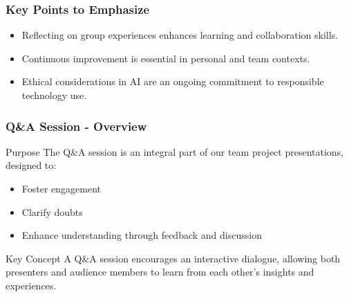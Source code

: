 \documentclass[aspectratio=169]{beamer}
\begin{document}
\begin{frame}[fragile]
    \frametitle{Key Points to Emphasize}
    \begin{itemize}
        \item Reflecting on group experiences enhances learning and collaboration skills.
        \item Continuous improvement is essential in personal and team contexts.
        \item Ethical considerations in AI are an ongoing commitment to responsible technology use.
    \end{itemize}
\end{frame}

\begin{frame}[fragile]
    \frametitle{Q\&A Session - Overview}
    \begin{block}{Purpose}
        The Q\&A session is an integral part of our team project presentations, designed to:
        \begin{itemize}
            \item Foster engagement
            \item Clarify doubts
            \item Enhance understanding through feedback and discussion
        \end{itemize}
    \end{block}
    \begin{block}{Key Concept}
        A Q\&A session encourages an interactive dialogue, allowing both presenters and audience members to learn from each other's insights and experiences.
    \end{block}
\end{frame}
\end{document}
